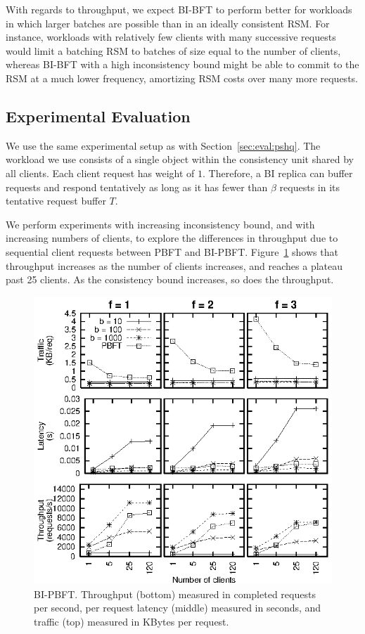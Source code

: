 \documentclass[twocolumn,10pt]{article}
\begin{document}
With regards to throughput, we expect BI-BFT to perform better for
workloads in which larger batches are possible than in an ideally
consistent RSM.  For instance, workloads with relatively few clients
with many successive requests would limit
a batching RSM to batches of size equal to the number of clients,
whereas BI-BFT with a high inconsistency bound might be able to commit
to the RSM at a much lower frequency, amortizing RSM costs over many
more requests.








\subsection{Experimental Evaluation}

We use the same experimental setup as with Section~\ref{sec:eval:pshq}.
The
workload we use consists of a single object within the consistency unit
shared by all clients.  Each client request has weight of $1$.
Therefore, a BI replica can buffer requests and respond tentatively as
long as it has fewer than $\beta$ requests in its tentative request
buffer $T$.

We perform experiments with increasing inconsistency bound, and with
increasing numbers of clients, to explore the differences in throughput
due to sequential client requests between PBFT and BI-PBFT.
Figure~\ref{fig:bi-pbft} shows that throughput increases as the number
of clients increases, and reaches a plateau past 25 clients.  As the
consistency bound increases, so does the throughput.

\begin{figure}
\centering
\includegraphics{graphs/bi-pbft}
\caption{BI-PBFT. Throughput (bottom) measured in completed requests per second,
  per request latency (middle) measured in seconds, and traffic
  (top) measured in KBytes per request.}
\label{fig:bi-pbft}
\end{figure}
\end{document}

